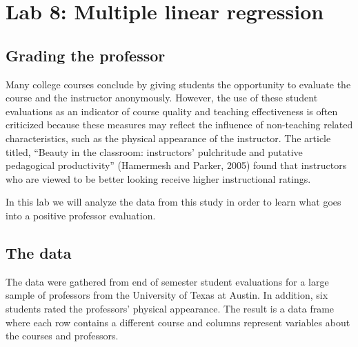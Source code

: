 \documentclass{article}\usepackage[]{graphicx}\usepackage[]{color}
\begin{document}

\section*{Lab 8: Multiple linear regression}

\subsection*{Grading the professor}

Many college courses conclude by giving students the opportunity to evaluate the course and the instructor anonymously.  However, the use of these student evaluations as an indicator of course quality and teaching effectiveness is often criticized because these measures may reflect the influence of non-teaching related characteristics, such as the physical appearance of the instructor.  The article titled, ``Beauty in the classroom: instructors' pulchritude and putative pedagogical productivity'' (Hamermesh and Parker, 2005) found that instructors who are viewed to be better looking receive higher instructional ratings.

In this lab we will analyze the data from this study in order to learn what goes into a positive professor evaluation.

\subsection*{The data}

The data were gathered from end of semester student evaluations for a large sample of professors from the University of Texas at Austin. In addition, six students rated the professors' physical appearance.  The result is a data frame where each row contains a different course and columns represent variables about the courses and professors.
\end{document}
